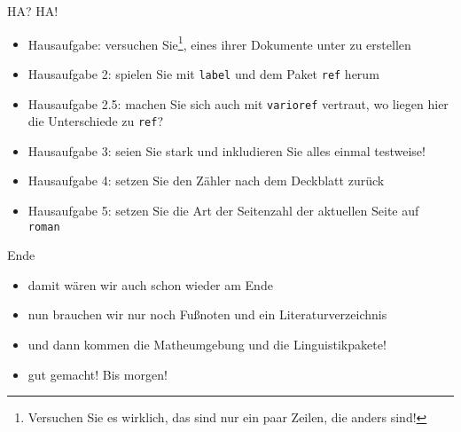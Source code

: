 
\begin{frame}[fragile]{HA? HA!}
    \begin{itemize}[<+->]
    \item Hausaufgabe: versuchen Sie\footnote{Versuchen Sie es wirklich, das sind nur ein paar Zeilen, die anders sind!}, eines ihrer Dokumente unter \XeTeX zu erstellen
    \item Hausaufgabe 2: spielen Sie mit \lstinline|label| und dem Paket \lstinline|ref| herum
    \item Hausaufgabe 2.5: machen Sie sich auch mit \lstinline|varioref| vertraut, wo liegen hier die Unterschiede zu \lstinline|ref|?
    \item Hausaufgabe 3: seien Sie stark und inkludieren Sie alles einmal testweise!
    \item Hausaufgabe 4: setzen Sie den Zähler nach dem Deckblatt zurück
    \item Hausaufgabe 5: setzen Sie die Art der Seitenzahl der aktuellen Seite auf \texttt{roman}
    \end{itemize}
\end{frame}

\begin{frame}[fragile]{Ende}
    \begin{itemize}[<+->]
    \item damit wären wir auch schon wieder am Ende
    \item nun brauchen wir nur noch Fußnoten und ein Literaturverzeichnis
    \item und dann kommen die Matheumgebung und die Linguistikpakete!
    \item gut gemacht! Bis morgen!
    \end{itemize}
\end{frame}

